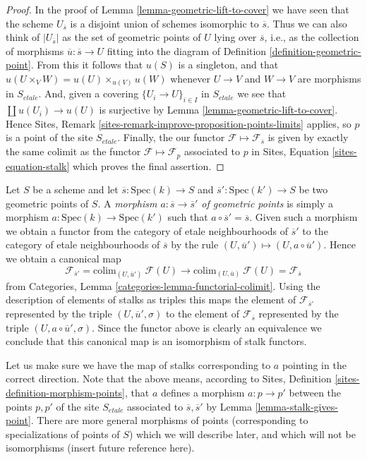 \begin{proof}
In the proof of
Lemma \ref{lemma-geometric-lift-to-cover}
we have seen that the scheme $U_{\overline{s}}$ is a disjoint union of
schemes isomorphic to $\overline{s}$. Thus we can also think of
$|U_{\overline{s}}|$ as the set of geometric points of $U$ lying over
$\overline{s}$, i.e., as the collection of morphisms
$\overline{u} : \overline{s} \to U$ fitting into the diagram of
Definition \ref{definition-geometric-point}.
From this it follows that $u(S)$ is a singleton, and that
$u(U \times_V W) = u(U) \times_{u(V)} u(W)$
whenever $U \to V$ and $W \to V$ are morphisms in $S_{etale}$.
And, given a covering $\{U_i \to U\}_{i \in I}$ in $S_{etale}$ we see that
$\coprod u(U_i) \to u(U)$ is surjective by
Lemma \ref{lemma-geometric-lift-to-cover}.
Hence
Sites, Remark \ref{sites-remark-improve-proposition-points-limits}
applies, so $p$ is a point of the site $S_{etale}$.
Finally, the our functor $\mathcal{F} \mapsto \mathcal{F}_{\overline{s}}$
is given by exactly the same colimit as the functor
$\mathcal{F} \mapsto \mathcal{F}_p$ associated to $p$ in
Sites, Equation \ref{sites-equation-stalk}
which proves the final assertion.
\end{proof}

\begin{remark}
\label{remark-map-stalks}
Let $S$ be a scheme and let $\overline{s} : \text{Spec}(k) \to S$
and $\overline{s}' : \text{Spec}(k') \to S$ be two geometric points of
$S$. A {\it morphism $a : \overline{s} \to \overline{s}'$ of geometric points}
is simply a morphism $a : \text{Spec}(k) \to \text{Spec}(k')$ such that
$a \circ \overline{s}' = \overline{s}$. Given such a morphism we obtain
a functor from the category of etale neighbourhoods of $\overline{s}'$
to the category of etale neighbourhoods of $\overline{s}$ by the rule
$(U, \overline{u}') \mapsto (U, a \circ \overline{u}')$. Hence we obtain
a canonical map
$$
\mathcal{F}_{\overline{s}'}
=
\text{colim}_{(U, \overline{u}')}\ \mathcal{F}(U)
\longrightarrow
\text{colim}_{(U, \overline{u})}\ \mathcal{F}(U)
=
\mathcal{F}_{\overline{s}}
$$
from Categories, Lemma \ref{categories-lemma-functorial-colimit}. Using the
description of elements of stalks as triples this maps the element of
$\mathcal{F}_{\overline{s}'}$ represented by the triple
$(U, \overline{u}', \sigma)$ to the element of $\mathcal{F}_{\overline{s}}$
represented by the triple $(U, a \circ \overline{u}', \sigma)$.
Since the functor above is clearly an equivalence we conclude that this
canonical map is an isomorphism of stalk functors.

\medskip\noindent
Let us make sure we have the map of stalks corresponding to $a$ pointing
in the correct direction. Note that the above means, according to
Sites, Definition \ref{sites-definition-morphism-points},
that $a$ defines a morphism $a : p \to p'$ between the points $p, p'$ of
the site $S_{etale}$ associated to $\overline{s}, \overline{s}'$ by
Lemma \ref{lemma-stalk-gives-point}. There are more general morphisms of
points (corresponding to specializations of points of $S$) which we will
describe later, and which will not be isomorphisms (insert future
reference here).
\end{remark}


